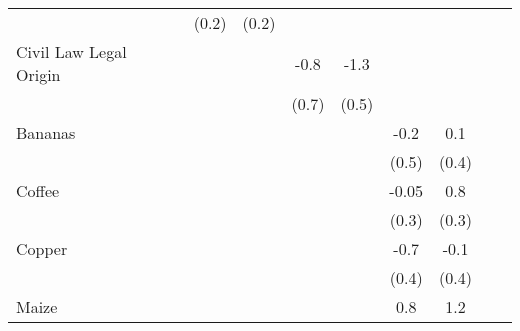{\begin{tabular}{l*{10}{c}}
                    &                     &                     &       (0.2)         &       (0.2)         &                     &                     &                     &                     &                     &                     \\
Civil Law Legal Origin&                     &                     &                     &                     &        -0.8         &        -1.3\sym{*}  &                     &                     &                     &                     \\
                    &                     &                     &                     &                     &       (0.7)         &       (0.5)         &                     &                     &                     &                     \\
Bananas             &                     &                     &                     &                     &                     &                     &        -0.2         &         0.1         &                     &                     \\
                    &                     &                     &                     &                     &                     &                     &       (0.5)         &       (0.4)         &                     &                     \\
Coffee              &                     &                     &                     &                     &                     &                     &       -0.05         &         0.8\sym{*}  &                     &                     \\
                    &                     &                     &                     &                     &                     &                     &       (0.3)         &       (0.3)         &                     &                     \\
Copper              &                     &                     &                     &                     &                     &                     &        -0.7         &        -0.1         &                     &                     \\
                    &                     &                     &                     &                     &                     &                     &       (0.4)         &       (0.4)         &                     &                     \\
Maize               &                     &                     &                     &                     &                     &                     &         0.8\sym{*}  &         1.2\sym{**} &                     &                     \\

\end{tabular}}
